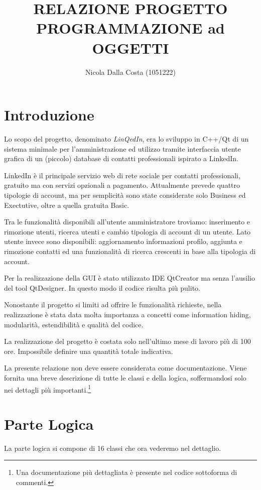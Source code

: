\documentclass[a4paper]{article}
\title{RELAZIONE PROGETTO\\PROGRAMMAZIONE ad OGGETTI}
\author{Nicola Dalla Costa (1051222)}
\date{}
\begin{document}
\maketitle
\raggedbottom

\section*{Introduzione}
Lo scopo del progetto, denominato \textit{LinQedIn}, era lo sviluppo in C++/Qt di un sistema minimale per l'amministrazione ed utilizzo tramite interfaccia utente grafica di un (piccolo) database di contatti professionali ispirato a LinkedIn. 

LinkedIn è il principale servizio web di rete sociale per contatti professionali, gratuito ma con servizi opzionali a pagamento. Attualmente prevede quattro tipologie di account, ma per semplicità sono state considerate solo Business ed Exectutive, oltre a quella gratuita Basic.

Tra le funzionalità disponibili all'utente amministratore troviamo: inserimento e rimozione utenti, ricerca utenti e cambio tipologia di account di un utente. Lato utente invece sono disponibili: aggiornamento informazioni profilo, aggiunta e rimozione contatti ed una funzionalità di ricerca crescenti in base alla tipologia di account.

Per la realizzazione della GUI è stato utilizzato IDE QtCreator ma senza l'ausilio del tool QtDesigner. In questo modo il codice risulta più pulito.

Nonostante il progetto si limiti ad offrire le funzionalità richieste, nella realizzazione è stata data molta importanza a concetti come information hiding, modularità, estendibilità e qualità del codice.

La realizzazione del progetto è costata solo nell'ultimo mese di lavoro più di 100 ore. Impossibile definire una quantità totale indicativa.

La presente relazione non deve essere considerata come documentazione. Viene fornita una breve descrizione di tutte le classi e della logica, soffermandosi solo nei dettagli più importanti.\footnote{Una documentazione più dettagliata è presente nel codice sottoforma di commenti.}

\section*{Parte Logica}
La parte logica si compone di 16 classi che ora vederemo nel dettaglio.
\end{document}
